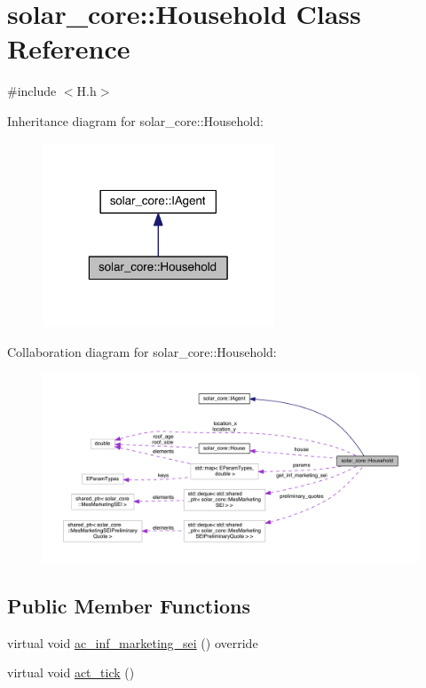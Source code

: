 \hypertarget{classsolar__core_1_1_household}{}\section{solar\+\_\+core\+:\+:Household Class Reference}
\label{classsolar__core_1_1_household}


{\ttfamily \#include $<$H.\+h$>$}



Inheritance diagram for solar\+\_\+core\+:\+:Household\+:
\nopagebreak
\begin{figure}[H]
\begin{center}
\leavevmode
\includegraphics[width=196pt]{classsolar__core_1_1_household__inherit__graph}
\end{center}
\end{figure}


Collaboration diagram for solar\+\_\+core\+:\+:Household\+:
\nopagebreak
\begin{figure}[H]
\begin{center}
\leavevmode
\includegraphics[width=350pt]{classsolar__core_1_1_household__coll__graph}
\end{center}
\end{figure}
\subsection*{Public Member Functions}
{\bf }\par
\begin{DoxyCompactItemize}
\item 
virtual void \hyperlink{classsolar__core_1_1_household_add38a49b76c2836a50a89e75318414f1}{ac\+\_\+inf\+\_\+marketing\+\_\+sei} () override
\item 
virtual void \hyperlink{classsolar__core_1_1_household_a1e7d20a60dc42b8d09a8d23a4cdb26a6}{act\+\_\+tick} ()
\end{DoxyCompactItemize}


